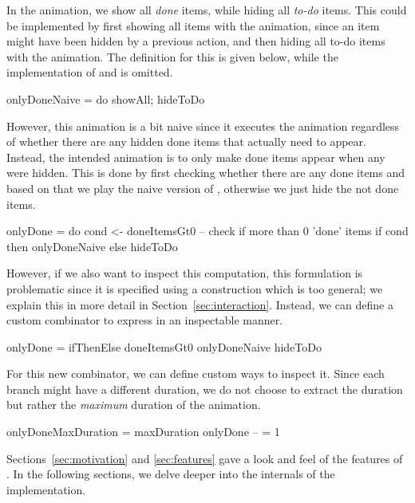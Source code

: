 In the  animation, we show all \emph{done} items, while
hiding all \emph{to-do} items. This could be implemented by first
showing all items with the  animation, since an item might have
been hidden by a previous action, and then hiding all to-do items with the
 animation. The definition for this is given below, while the
implementation of  and  is omitted.

\begin{spec}
onlyDoneNaive = do showAll; hideToDo
\end{spec}

However, this animation is a bit naive since it executes the 
animation regardless of whether there are any hidden done items that actually
need to appear. Instead, the intended animation is to only make done items
appear when any were hidden. This is done by first checking whether there are
any done items and based on that we play the naive version of ,
otherwise we just hide the not done items.

\begin{spec}
onlyDone = do
  cond <- doneItemsGt0    -- check if more than 0 'done' items
  if cond then onlyDoneNaive else hideToDo
\end{spec}

However, if we also want to inspect this computation, this formulation
is problematic since it is specified using a construction which is too general;
we explain this in more detail in Section~\ref{sec:interaction}. Instead, we
can define a custom combinator  to express 
in an inspectable manner.

\begin{spec}
onlyDone = ifThenElse doneItemsGt0 onlyDoneNaive hideToDo
\end{spec}

For this new combinator, we can define custom ways to inspect it. Since each
branch might have a different duration, we do not choose to extract the
duration but rather the \emph{maximum} duration of the animation.

\begin{spec}
onlyDoneMaxDuration = maxDuration onlyDone -- = 1
\end{spec}

Sections~\ref{sec:motivation} and \ref{sec:features} gave a look and feel of the
features of \dsl{}. In the following sections, we delve deeper into the
internals of the implementation.
